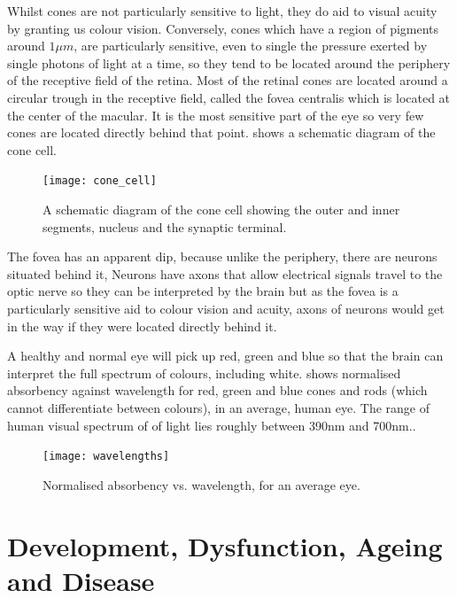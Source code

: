 Whilst cones are not particularly sensitive to light, they do aid to visual
acuity by granting us colour vision.\cite{bowmaker1980visual} Conversely, cones
which have a region of pigments around $1\mu{m}$, are particularly sensitive,
even to single the pressure exerted by single photons of light at a time,
so they tend to be located around the periphery of the receptive field of
the retina.\cite{liebman1964sensitive,baylor1979responses} 
Most of the retinal cones are located around a circular trough in the
receptive field, called the fovea centralis which is located at the center
of the macular.\cite{hendrickson1994primate} It is the most sensitive part
of the eye so very few cones are located directly behind that point.
 shows a schematic diagram of the cone cell.

\begin{figure}[!htbp]
  \centering
    \texttt{[image: cone\_cell]}
  \caption{A schematic diagram of the cone cell showing the outer and inner segments, nucleus
  and the synaptic terminal.\cite{wikicone}}
  \label{fig:cone}
\end{figure}

The fovea has an apparent dip, because unlike the periphery,
there are neurons situated behind it, Neurons have axons that allow electrical
signals travel to the optic nerve so they can be interpreted by the brain but
as the fovea is a particularly sensitive aid to colour vision and acuity,
axons of neurons would get in the way if they were located directly behind it.

A healthy and normal eye will pick up red, green and blue so that the brain
can interpret the full spectrum of colours, including white. 
shows normalised absorbency against wavelength for red, green and blue cones
and rods (which cannot differentiate between colours), in an average, human eye.
The range of human visual spectrum of of light lies roughly between 390nm
and 700nm.\cite{starr2010biology}.

\begin{figure}[!htbp]
  \centering
    \texttt{[image: wavelengths]}
  \caption{Normalised absorbency vs. wavelength, for an average eye.}
  \label{fig:wavelengths}
\end{figure}

\section{Development, Dysfunction, Ageing and Disease}

